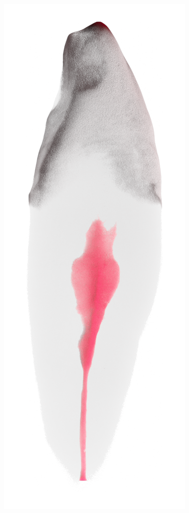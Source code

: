 \begin{frame}
\begin{frame}
		\includegraphics[height=\imheight]{./images/zmk/rcs/Tooth0278}%

\end{frame}
\end{frame}
